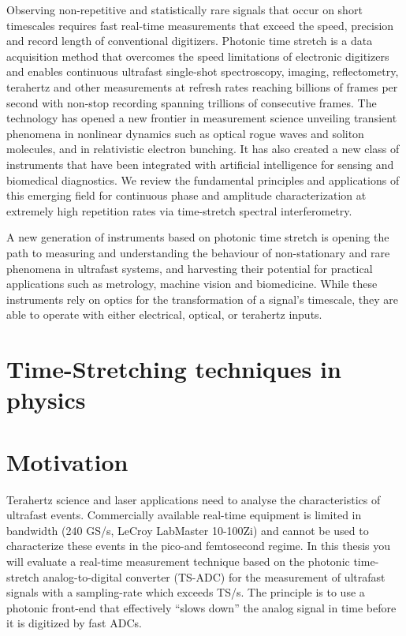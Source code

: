 Observing non-repetitive and statistically rare signals that occur on short timescales requires fast real-time measurements that exceed the speed, precision and record length of conventional digitizers. Photonic time stretch is a data acquisition method that overcomes the speed limitations of electronic digitizers and enables continuous ultrafast single-shot spectroscopy, imaging, reflectometry, terahertz and other measurements at refresh rates reaching billions of frames per second with non-stop recording spanning trillions of consecutive frames. The technology has opened a new frontier in measurement science unveiling transient phenomena in nonlinear dynamics such as optical rogue waves and soliton molecules, and in relativistic electron bunching. It has also created a new class of instruments that have been integrated with artificial intelligence for sensing and biomedical diagnostics. We review the fundamental principles and applications of this emerging field for continuous phase and amplitude characterization at extremely high repetition rates via time-stretch spectral interferometry.

A new generation of instruments based on photonic time stretch is opening the path to measuring and understanding the behaviour of non-stationary and rare phenomena in ultrafast systems, and harvesting their potential for practical applications such as metrology, machine vision and biomedicine. While these instruments rely on optics for the transformation of a signal's timescale, they are able to operate with either electrical, optical, or terahertz inputs.




\section{Time-Stretching techniques in physics}


\section{Motivation}
Terahertz science and laser applications need to analyse the characteristics of ultrafast events. Commercially available real-time equipment is limited in bandwidth (240 GS/s, LeCroy LabMaster 10-100Zi) and cannot be used to characterize these events in the pico-and femtosecond regime. In this thesis you will evaluate a real-time measurement technique based on the photonic time-stretch analog-to-digital converter (TS-ADC) for the measurement of ultrafast signals with a sampling-rate which exceeds TS/s. The principle is to use a photonic front-end that effectively “slows down” the analog signal in time before it is digitized by fast ADCs.


